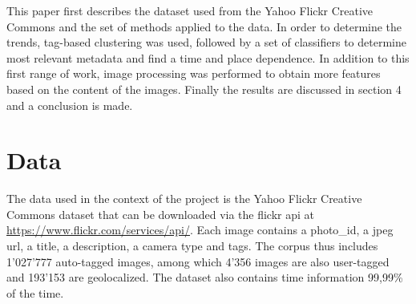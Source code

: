 \documentclass[sigconf]{acmart}
\begin{document}
This paper first describes the dataset used from the Yahoo Flickr Creative Commons and the set of methods applied to the data. In order to determine the trends, tag-based clustering was used, followed by a set of classifiers to determine most relevant metadata and find a time and place dependence. In addition to this first range of work, image processing was performed to obtain more features based on the content of the images. Finally the results are discussed in section 4 and a conclusion is made.

\section{Data}
The data used in the context of the project is the Yahoo Flickr Creative Commons dataset that can be downloaded via the flickr api at \url{https://www.flickr.com/services/api/}. Each image contains a photo\_id, a jpeg url, a title, a description, a camera type and tags. The corpus thus includes 1'027'777 auto-tagged images, among which 4'356  images are also user-tagged and 193'153 are geolocalized. The dataset also contains time information 99,99\% of the time.




\end{document}
